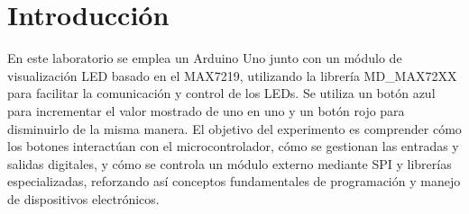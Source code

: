 \section{Introducción}

En este laboratorio se emplea un Arduino Uno junto con un módulo de visualización LED basado en el MAX7219,
utilizando la librería MD\_MAX72XX para facilitar la comunicación y control de los LEDs. Se utiliza un botón 
azul para incrementar el valor mostrado de uno en uno y un botón rojo para disminuirlo de la misma manera. 
El objetivo del experimento es comprender cómo los botones interactúan con el microcontrolador, 
cómo se gestionan las entradas y salidas digitales, y cómo se controla un módulo externo mediante SPI y librerías especializadas, 
reforzando así conceptos fundamentales de programación y manejo de dispositivos electrónicos.